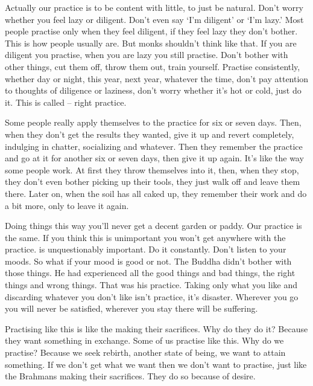 Actually our practice is to be content with little, to just be natural. Don't worry whether you feel lazy or diligent. Don't even say `I'm diligent' or `I'm lazy.' Most people practise only when they feel diligent, if they feel lazy they don't bother. This is how people usually are. But monks shouldn't think like that. If you are diligent you practise, when you are lazy you still practise. Don't bother with other things, cut them off, throw them out, train yourself. Practise consistently, whether day or night, this year, next year, whatever the time, don't pay attention to thoughts of diligence or laziness, don't worry whether it's hot or cold, just do it. This is called  -- right practice.

Some people really apply themselves to the practice for six or seven days. Then, when they don't get the results they wanted, give it up and revert completely, indulging in chatter, socializing and whatever. Then they remember the practice and go at it for another six or seven days, then give it up again. It's like the way some people work. At first they throw themselves into it, then, when they stop, they don't even bother picking up their tools, they just walk off and leave them there. Later on, when the soil has all caked up, they remember their work and do a bit more, only to leave it again.

Doing things this way you'll never get a decent garden or paddy. Our practice is the same. If you think this  is unimportant you won't get anywhere with the practice.  is unquestionably important. Do it constantly. Don't listen to your moods. So what if your mood is good or not. The Buddha didn't bother with those things. He had experienced all the good things and bad things, the right things and wrong things. That was his practice. Taking only what you like and discarding whatever you don't like isn't practice, it's disaster. Wherever you go you will never be satisfied, wherever you stay there will be suffering.

Practising like this is like the  making their sacrifices. Why do they do it? Because they want something in exchange. Some of us practise like this. Why do we practise? Because we seek rebirth, another state of being, we want to attain something. If we don't get what we want then we don't want to practise, just like the Brahmans making their sacrifices. They do so because of desire.

